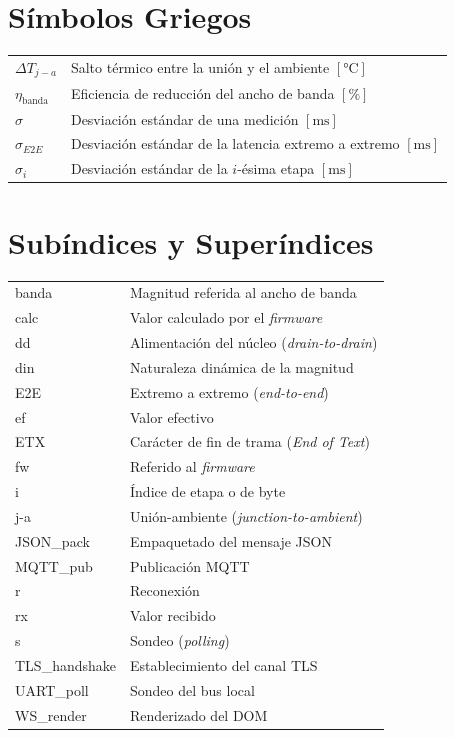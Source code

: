 \section*{Símbolos Griegos}
\begin{tabular}{@{}l@{\hspace{1.5em}}p{}@{}}
$\Delta T_{j-a}$ & Salto térmico entre la unión y el ambiente $[\text{°C}]$ \\
$\eta_{\text{banda}}$ & Eficiencia de reducción del ancho de banda $[\%]$ \\
$\sigma$ & Desviación estándar de una medición $[\text{ms}]$ \\
$\sigma_{E2E}$ & Desviación estándar de la latencia extremo a extremo $[\text{ms}]$ \\
$\sigma_i$ & Desviación estándar de la $i$-ésima etapa $[\text{ms}]$ \\
\end{tabular}

\section*{Subíndices y Superíndices}
\begin{tabular}{@{}l@{\hspace{1.5em}}p{}@{}}
banda & Magnitud referida al ancho de banda \\
calc & Valor calculado por el \textit{firmware} \\
dd & Alimentación del núcleo (\textit{drain-to-drain}) \\
din & Naturaleza dinámica de la magnitud \\
E2E & Extremo a extremo (\textit{end-to-end}) \\
ef & Valor efectivo \\
ETX & Carácter de fin de trama (\textit{End of Text}) \\
fw & Referido al \textit{firmware} \\
i & Índice de etapa o de byte \\
j-a & Unión-ambiente (\textit{junction-to-ambient}) \\
JSON\_pack & Empaquetado del mensaje JSON \\
MQTT\_pub & Publicación MQTT \\
r & Reconexión \\
rx & Valor recibido \\
s & Sondeo (\textit{polling}) \\
TLS\_handshake & Establecimiento del canal TLS \\
UART\_poll & Sondeo del bus local \\
WS\_render & Renderizado del DOM \\
\end{tabular}
